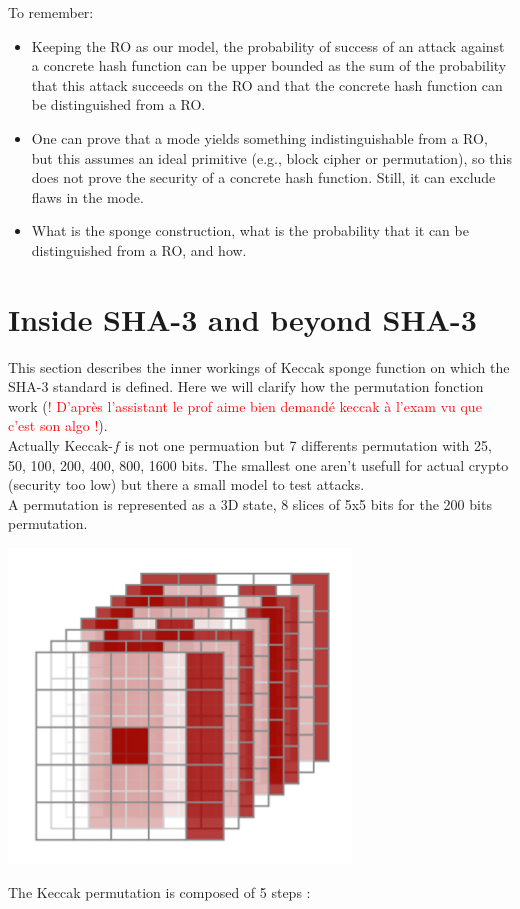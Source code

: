 \documentclass[11pt,a4paper]{report}
\begin{document}
To remember:
\begin{itemize}
\item Keeping the RO as our model, the probability of success of an attack against a concrete hash function can be upper bounded as the sum of the probability that this attack succeeds on the RO and that the concrete hash function can be distinguished from a RO.
\item One can prove that a mode yields something indistinguishable from a RO, but this assumes an ideal primitive (e.g., block cipher or permutation), so this does not prove the security of a concrete hash function. Still, it can exclude flaws in the mode.
\item What is the sponge construction, what is the probability that it can be distinguished from a RO, and how.
\end{itemize}

\section{Inside SHA-3 and beyond SHA-3}
This section describes the inner workings of Keccak sponge function on which the SHA-3 standard is defined. Here we will clarify how the permutation fonction work (\textcolor{red}{! D'après l'assistant le prof aime bien demandé keccak à l'exam vu que c'est son algo !}).\\

Actually Keccak-$f$ is not one permuation but 7 differents permutation with 25, 50, 100, 200, 400, 800, 1600 bits. The smallest one aren't usefull for actual crypto (security too low) but there a small model to test attacks.\\
A permutation is represented as a 3D state, 8 slices of 5x5 bits for the 200 bits permutation. 
\begin{center}
\includegraphics[scale=0.5]{img/img28.png}
\end{center}
The Keccak permutation is composed of 5 steps : 
\end{document}
